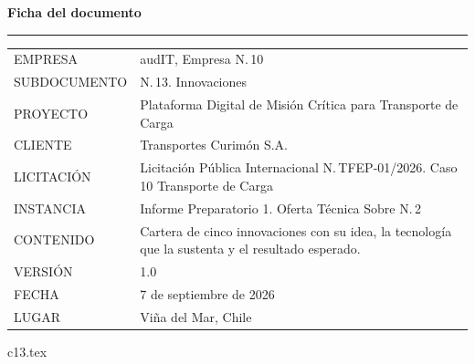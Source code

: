 \documentclass[12pt, letterpaper, table, xcdraw]{inf-pucv}
\begin{document}

\thispagestyle{folioficha}
\vspace*{1.2cm}
{\color{audITnavy}\fontsize{28}{32}\selectfont\bfseries Ficha del documento}

\vspace{10pt}
{\color{audITteal}\rule{\linewidth}{2pt}}

\vspace{22pt}
{\small
\begin{longtable}{@{}p{3.5cm}p{10.5cm}@{}}
\color{audITgris}EMPRESA & \color{black}audIT, Empresa N.\textordmasculine{}\,10 \\
\color{audITgris}SUBDOCUMENTO & \color{black}N.\textordmasculine{}\,13. Innovaciones \\
\color{audITgris}PROYECTO & \color{black}Plataforma Digital de Misión Crítica para Transporte de Carga \\
\color{audITgris}CLIENTE & \color{black}Transportes Curimón S.A. \\
\color{audITgris}LICITACIÓN & \color{black}Licitación Pública Internacional N.\textordmasculine{}\,TFEP-01/2026. Caso 10 Transporte de Carga \\
\color{audITgris}INSTANCIA & \color{black}Informe Preparatorio 1. Oferta Técnica Sobre N.\textordmasculine{}\,2 \\
\color{audITgris}CONTENIDO & \color{black}Cartera de cinco innovaciones con su idea, la tecnología que la sustenta y el resultado esperado. \\
\color{audITgris}VERSIÓN & \color{black}1.0 \\
\color{audITgris}FECHA & \color{black}7 de septiembre de 2026 \\
\color{audITgris}LUGAR & \color{black}Viña del Mar, Chile \\
\end{longtable}}
\clearpage

\renewcommand{\contentsname}{Índice}
\tableofcontents
\clearpage

{c13.tex}

\clearpage
{}
{}
\printbibliography[title={Bibliografía}]
\end{document}

